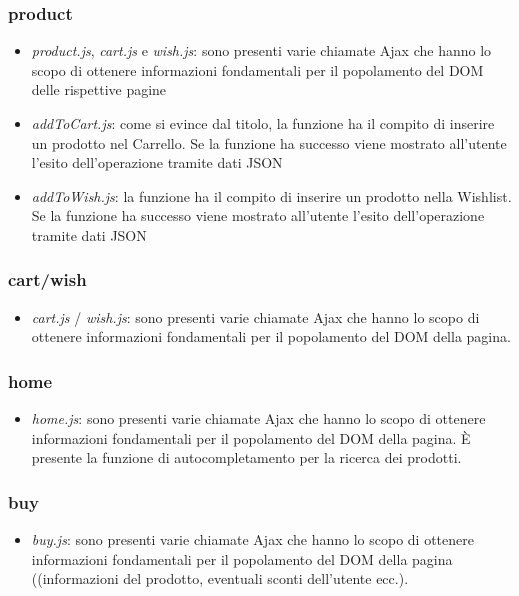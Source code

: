 \documentclass[14pt]{extarticle}
\begin{document}
\subsubsection*{product}
\begin{itemize}
    \item \textit{product.js}, \textit{cart.js} e \textit{wish.js}: sono presenti varie chiamate Ajax che hanno lo scopo di
ottenere informazioni fondamentali per il popolamento del DOM delle rispettive pagine
    \item \textit{addToCart.js}: come si evince dal titolo, la funzione ha il compito di inserire un prodotto nel
Carrello. Se la funzione ha successo viene mostrato all'utente l'esito dell'operazione tramite
dati JSON
    \item \textit{addToWish.js}: la funzione ha il compito di inserire un prodotto nella Wishlist. Se la funzione
ha successo viene mostrato all'utente l'esito dell'operazione tramite dati JSON
\end{itemize}

\subsubsection*{cart/wish}
\begin{itemize}
    \item \textit{cart.js} / \textit{wish.js}: sono presenti varie chiamate Ajax che hanno lo scopo di ottenere
    informazioni fondamentali per il popolamento del DOM della pagina.
\end{itemize}

\subsubsection*{home}
\begin{itemize}
    \item \textit{home.js}: sono presenti varie chiamate Ajax che hanno lo scopo di ottenere informazioni
    fondamentali per il popolamento del DOM della pagina. È presente la funzione di autocompletamento per la ricerca dei prodotti.
\end{itemize}

\subsubsection*{buy}
\begin{itemize}
    \item \textit{buy.js}: sono presenti varie chiamate Ajax che hanno lo scopo di ottenere informazioni
    fondamentali per il popolamento del DOM della pagina ((informazioni del prodotto, eventuali
    sconti dell'utente ecc.).
\end{itemize}
\end{document}
